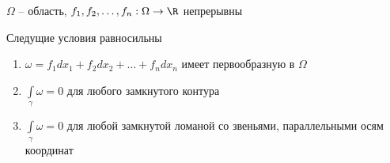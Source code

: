 \begin{theorem}\thmslashn

	$\Omega$ -- область, $f_1, f_2, \ldots, f_n : \Omega\to \R$ непрерывны
	
	Следущие условия равносильны 
	
	\begin{enumerate}
		\item 
		$\omega =  f_1 dx_1 + f_2dx_2 + \ldots + f_ndx_n$ имеет первообразную в $\Omega$
		
		\item
		$\int\limits_\gamma \omega = 0$ для любого замкнутого контура
		
		\item
		$\int\limits_\gamma \omega = 0$ для любой замкнутой ломаной со звеньями, параллельными осям координат
		
	\end{enumerate} 

\end{theorem}

